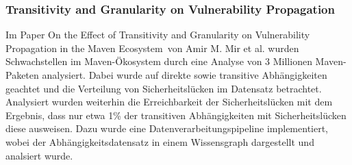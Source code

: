 \subsubsection{Transitivity and Granularity on Vulnerability Propagation} \label{sec:Transitivity}
Im Paper \glqq On the Effect of Transitivity and Granularity on Vulnerability Propagation in the Maven Ecosystem\grqq~von Amir M. Mir et al. wurden Schwachstellen im Maven-Ökosystem durch eine Analyse von 3 Millionen Maven-Paketen analysiert.
Dabei wurde auf direkte sowie transitive Abhängigkeiten geachtet und die Verteilung von Sicherheitslücken im Datensatz betrachtet.
Analysiert wurden weiterhin die Erreichbarkeit der Sicherheitslücken mit dem Ergebnis, dass nur etwa 1\% der transitiven Abhängigkeiten mit Sicher\-heits\-lücken diese ausweisen.
Dazu wurde eine Datenverarbeitungspipeline implementiert, wobei der Abhängigkeitsdatensatz in einem Wissensgraph dargestellt und analsiert wurde.